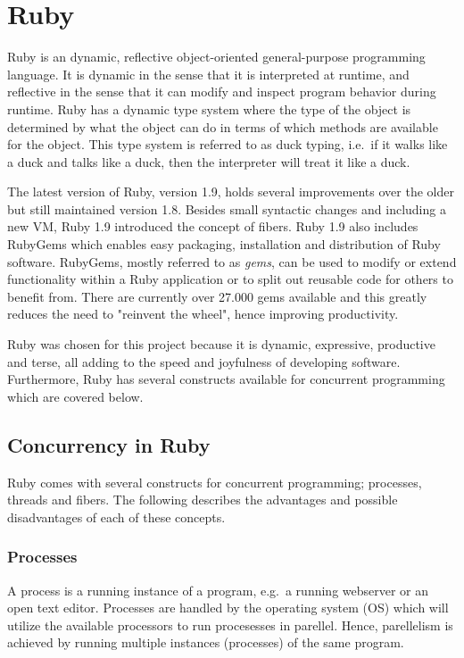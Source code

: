 \section{Ruby} %
\label{sec:ruby}

Ruby is an dynamic, reflective object-oriented general-purpose programming
language. It is dynamic in the sense that it is interpreted at runtime, and
reflective in the sense that it can modify and inspect program behavior during
runtime.  Ruby has a dynamic type system where the type of the object is
determined by what the object can do in terms of which methods are available
for the object. This type system is referred to as duck typing, i.e.\ if it
walks like a duck and talks like a duck, then the interpreter will treat it
like a duck.

The latest version of Ruby, version 1.9, holds several improvements over the
older but still maintained version 1.8. Besides small syntactic changes and
including a new VM, Ruby 1.9 introduced the concept of fibers. Ruby 1.9 also
includes RubyGems which enables easy packaging, installation and distribution of
Ruby software. RubyGems, mostly referred to as \textit{gems}, can be used to
modify or extend functionality within a Ruby application or to split out
reusable code for others to benefit from. There are currently over 27.000 gems
available and this greatly reduces the need to "reinvent the wheel", hence
improving productivity. 

Ruby was chosen for this project because it is dynamic, expressive, productive
and terse, all adding to the speed and joyfulness of developing software.
Furthermore, Ruby has several constructs available for concurrent programming
which are covered below.

\subsection{Concurrency in Ruby}
Ruby comes with several constructs for concurrent programming; processes, threads
and fibers. The following describes the advantages and possible disadvantages
of each of these concepts.

\subsubsection{Processes}
A process is a running instance of a program, e.g.\ a running webserver or an
open text editor. Processes are handled by the operating system (OS) which
will utilize the available processors to run procesesses in parellel.
Hence, parellelism is achieved by running multiple instances (processes) of
the same program.

